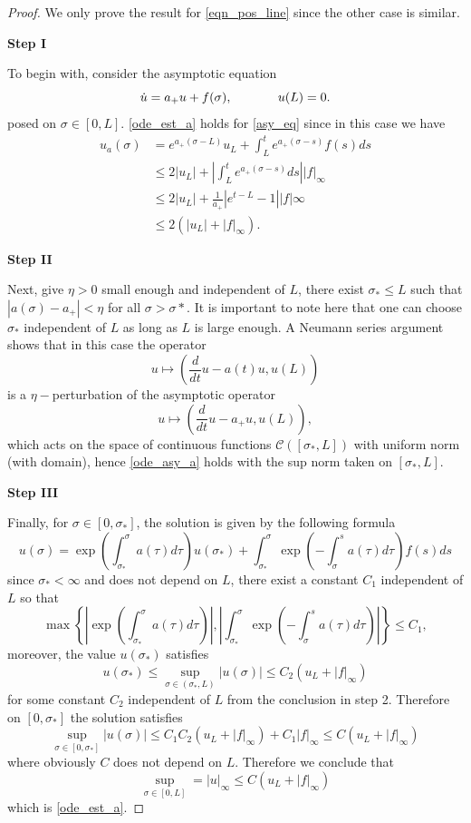 \documentclass[letterpaper,11pt]{article}
\numberwithin{equation}{section}
\theoremstyle{plain}
\begin{document}
\begin{proof}
We only prove the result for \eqref{eqn_pos_line} since the other case is similar. 

\textbf{Step I}

To begin with, consider the asymptotic equation 
\begin{equation}\label{asy_eq}
\dot{u} = a_+ u + f(\sigma),\hspace{ 0.5in } u(L) = 0.
\end{equation}
posed on $\sigma \in [0, L]$.
\eqref{ode_est_a} holds for \eqref{asy_eq} since in this case we have
\begin{align*}
u_a(\sigma) &= e^{a_+(\sigma-L)}u_L + \int_L^t e^{a_+(\sigma-s)} f(s)ds \\ 
&\le 2|u_L| + \left|\int_L^t e^{a_+(\sigma-s)}ds \right| |f|_\infty\\ 
&\le  2|u_L|+\frac{1}{a_+} \left|e^{t-L}-1\right||f|\infty\\
& \le 2(|u_L|+|f|_\infty ).
\end{align*}

\textbf{Step II}

Next, give $\eta>0$ small enough and independent of $L$, there exist $\sigma_* \le L$ such that $|a(\sigma)- a_+|< \eta$ for all $\sigma>\sigma*$. It is important to note here that one can choose $\sigma_*$ independent of $L$ as long as $L$ is large enough. A Neumann series argument shows that in this case the operator 
\[ u \mapsto
 \left(\frac{d}{dt}u-a(t)u, u(L)\right)
\] is a $\eta-$perturbation of the asymptotic operator
\[ u \mapsto
 \left(\frac{d}{dt}u-a_+u, u(L)\right),
\]
which acts on the space of continuous functions $\mathcal{C}([\sigma_*,L])$ with uniform norm (with domain), hence \eqref{ode_asy_a} holds with the sup norm taken on $[\sigma_*, L]$.

\textbf{Step III}

Finally, for $\sigma \in [0,\sigma_*]$, the solution is given by the following formula
\[
u(\sigma) = \exp\left(\int^{\sigma}_{\sigma_*} a(\tau)d\tau\right) u(\sigma_*) + \int_{\sigma_*}^{\sigma} \exp\left(-\int_{\sigma}^{s}a(\tau)d\tau\right)f(s)ds 
\]
since $\sigma_*< \infty$ and does not depend on $L$, there exist a constant $C_1$ independent of $L$ so that 
\[
\max\left\{ \left|\exp\left(\int^{\sigma}_{\sigma_*} a(\tau)d\tau\right)\right|, \left| \int_{\sigma_*}^{\sigma} \exp\left(-\int_{\sigma}^{s}a(\tau)d\tau\right)\right| \right\} \le C_1,
\]
moreover, the value $u(\sigma_*)$ satisfies
\[
u(\sigma_*) \le \sup_{\sigma \in (\sigma_*,L)} |u(\sigma)| \le C_2(u_L + |f|_\infty)
\]
for some constant $C_2$ independent of $L$ from the conclusion in step 2.
Therefore on $[0,\sigma_*]$ the solution satisfies
\[
\sup_{\sigma \in [0,\sigma_*]}|u(\sigma)| \le C_1C_2(u_L+|f|_\infty) +C_1|f|_\infty \le C(u_L+|f|_\infty)
\]
where obviously $C$ does not depend on $L$. Therefore we conclude that
\[
\sup_{\sigma \in [0,L]} = |u|_\infty \le C(u_L+|f|_\infty)
\]
which is \eqref{ode_est_a}.
\nocite{*}
\end{proof}





\end{document}
